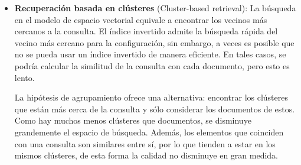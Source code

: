 \documentclass[t,compress,10pt,xcolor=dvipsnames]{beamer}
\begin{document}
{\begin{itemize}
			\framebreak
			\textcolor{white}{.}
			
			\item \textbf{Recuperaci\'on basada en cl\'usteres} (Cluster-based retrieval): La búsqueda en el modelo de espacio vectorial equivale a encontrar los vecinos más cercanos a la consulta. El índice invertido admite la búsqueda rápida del vecino más cercano para la configuración, sin embargo, a veces es posible que no se pueda usar un índice invertido de manera eficiente. En tales casos, se podr\'ia calcular la similitud de la consulta con cada documento, pero esto es lento. 
			
			La hipótesis de agrupamiento ofrece una alternativa: encontrar los cl\'usteres que están más cerca de la consulta y sólo considerar los documentos de estos. Como hay muchos menos clústeres que documentos, se disminuye grandemente el espacio de b\'usqueda. Adem\'as, los elementos que coinciden con una consulta son similares entre sí, por lo que tienden a estar en los mismos cl\'usteres, de esta forma la calidad no disminuye en gran medida.
		\end{itemize}
	}
\end{document}

